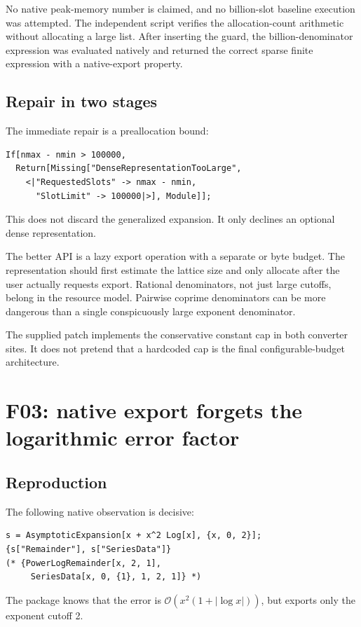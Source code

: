 \documentclass[11pt,a4paper]{article}
\newcommand{\code}[1]{\texttt{\detokenize{#1}}}
\newcommand{\OO}{\mathcal O}
\begin{document}
No native peak-memory number is claimed, and no billion-slot baseline execution was attempted. The independent script verifies the allocation-count arithmetic without allocating a large list. After inserting the guard, the billion-denominator expression was evaluated natively and returned the correct sparse finite expression with a \code{Missing} native-export property.

\subsection{Repair in two stages}
The immediate repair is a preallocation bound:
\begin{lstlisting}
If[nmax - nmin > 100000,
  Return[Missing["DenseRepresentationTooLarge",
    <|"RequestedSlots" -> nmax - nmin,
      "SlotLimit" -> 100000|>], Module]];
\end{lstlisting}
This does not discard the generalized expansion. It only declines an optional dense representation.

The better API is a lazy export operation with a separate \code{"MaxSeriesDataSlots"} or byte budget. The representation should first estimate the lattice size and only allocate after the user actually requests export. Rational denominators, not just large cutoffs, belong in the resource model. Pairwise coprime denominators can be more dangerous than a single conspicuously large exponent denominator.

The supplied patch implements the conservative constant cap in both converter sites. It does not pretend that a hardcoded cap is the final configurable-budget architecture.

\section{F03: native export forgets the logarithmic error factor}

\subsection{Reproduction}
The following native observation is decisive:
\begin{lstlisting}
s = AsymptoticExpansion[x + x^2 Log[x], {x, 0, 2}];
{s["Remainder"], s["SeriesData"]}
(* {PowerLogRemainder[x, 2, 1],
     SeriesData[x, 0, {1}, 1, 2, 1]} *)
\end{lstlisting}
The package knows that the error is $\OO(x^2(1+|\log x|))$, but exports only the exponent cutoff 2.
\end{document}
